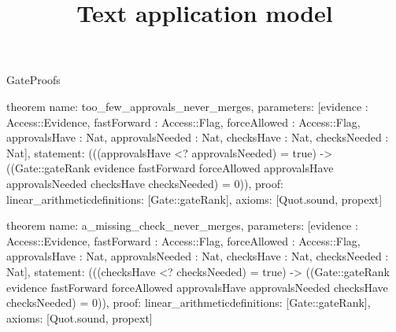 \begin{lexlean}{GateProofs}
\title{Text application model}
\begin{semanticmodule}
theorem{
  name: too_few_approvals_never_merges,
  parameters: [evidence : Access::Evidence, fastForward : Access::Flag, forceAllowed : Access::Flag, approvalsHave : Nat, approvalsNeeded : Nat, checksHave : Nat, checksNeeded : Nat],
  statement: (((approvalsHave <? approvalsNeeded) = true) -> ((Gate::gateRank evidence fastForward forceAllowed approvalsHave approvalsNeeded checksHave checksNeeded) = 0)),
  proof: linear_arithmetic{definitions: [Gate::gateRank]},
  axioms: [Quot.sound, propext]
}

theorem{
  name: a_missing_check_never_merges,
  parameters: [evidence : Access::Evidence, fastForward : Access::Flag, forceAllowed : Access::Flag, approvalsHave : Nat, approvalsNeeded : Nat, checksHave : Nat, checksNeeded : Nat],
  statement: (((checksHave <? checksNeeded) = true) -> ((Gate::gateRank evidence fastForward forceAllowed approvalsHave approvalsNeeded checksHave checksNeeded) = 0)),
  proof: linear_arithmetic{definitions: [Gate::gateRank]},
  axioms: [Quot.sound, propext]
}
\end{semanticmodule}
\end{lexlean}
